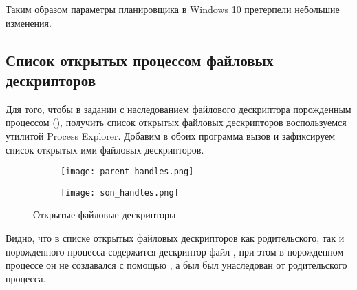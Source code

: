 Таким образом параметры планировщика в Windows 10 претерпели небольшие изменения.

\newpage

\subsection*{Список открытых процессом файловых дескрипторов}

Для того, чтобы в задании с наследованием файлового дескриптора порожденным процессом (), получить список открытых файловых дескрипторов воспользуемся утилитой Process Explorer. Добавим в обоих программа вызов  и зафиксируем список открытых ими файловых дескрипторов.
\begin{figure}[H]
	\centering
	\begin{subfigure}{\linewidth}
		\texttt{[image: parent\_handles.png]}
		\vspace{0.5em}
	\end{subfigure}
	\begin{subfigure}{\linewidth}
		\texttt{[image: son\_handles.png]}
	\end{subfigure}
	\caption{Открытые файловые дескрипторы}
\end{figure}
Видно, что в списке открытых файловых дескрипторов как родительского, так и порожденного процесса содержится дескриптор файл , при этом в порожденном процессе он не создавался с помощью , а был был унаследован от родительского процесса.



